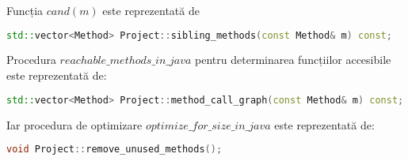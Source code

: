 Funcția $cand(m)$ este reprezentată de
\begin{lstlisting}[language=C++]
std::vector<Method> Project::sibling_methods(const Method& m) const;
\end{lstlisting}

Procedura $reachable\_methods\_in\_java$ pentru determinarea funcțiilor
accesibile este reprezentată de:

\begin{lstlisting}[language=C++]
std::vector<Method> Project::method_call_graph(const Method& m) const;
\end{lstlisting}

Iar procedura de optimizare $optimize\_for\_size\_in\_java$ este reprezentată de:
\begin{lstlisting}[language=C++]
void Project::remove_unused_methods();
\end{lstlisting}
